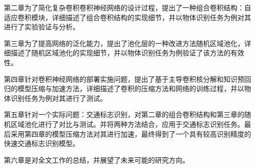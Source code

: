 第二章为了简化复杂卷积卷积神经网络的设计过程，提出了一种组合卷积结构：自适应卷积模块，详细描述了组合卷积结构的实现细节，并以物体识别任务为例对其进行了实验验证与分析。

第三章为了提高网络的泛化能力，提出了池化层的一种改进方法随机区域池化，详细描述了随机区域池化的实现细节，并以物体识别任务为例验证了该方法的有效性。

第四章针对卷积神经网络的部署实施问题，提出了基于主导卷积核分解和知识预回归的模型压缩与加速方法，详细描述了卷积的压缩方法和网络的训练过程，并以物体识别任务为例对其进行了测试。

第五章针对一个实际问题：交通标志识别，对第二章的组合卷积结构和第三章的随机区域池化进行了对比与测试。并将两种方法结合，应用于交通标志识别任务。最后采用第四章的模型压缩方法对其进行加速，最终得到了一个具有较高识别精度的快速交通标志识别模型。

第六章是对全文工作的总结，并展望了未来可能的研究方向。

